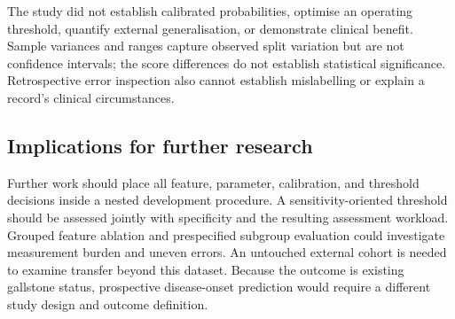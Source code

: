 The study did not establish calibrated probabilities, optimise an operating threshold, quantify external generalisation, or demonstrate clinical benefit. Sample variances and ranges capture observed split variation but are not confidence intervals; the score differences do not establish statistical significance. Retrospective error inspection also cannot establish mislabelling or explain a record's clinical circumstances.

\subsection{Implications for further research}
Further work should place all feature, parameter, calibration, and threshold decisions inside a nested development procedure. A sensitivity-oriented threshold should be assessed jointly with specificity and the resulting assessment workload. Grouped feature ablation and prespecified subgroup evaluation could investigate measurement burden and uneven errors. An untouched external cohort is needed to examine transfer beyond this dataset. Because the outcome is existing gallstone status, prospective disease-onset prediction would require a different study design and outcome definition.

